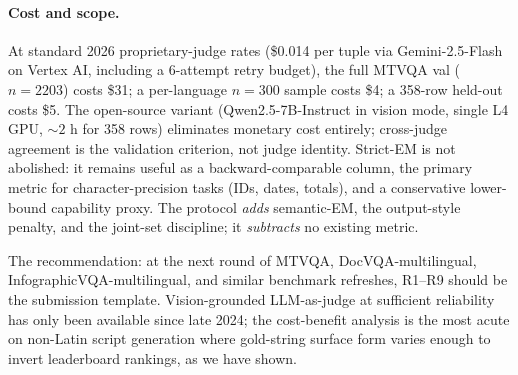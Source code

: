 \paragraph{Cost and scope.}
At standard 2026 proprietary-judge rates (\$0.014 per tuple via Gemini-2.5-Flash on Vertex AI, including a 6-attempt retry budget), the full MTVQA val ($n=2203$) costs \$31; a per-language $n=300$ sample costs \$4; a 358-row held-out costs \$5. The open-source variant (Qwen2.5-7B-Instruct in vision mode, single L4 GPU, $\sim 2$ h for 358 rows) eliminates monetary cost entirely; cross-judge agreement is the validation criterion, not judge identity. Strict-EM is not abolished: it remains useful as a backward-comparable column, the primary metric for character-precision tasks (IDs, dates, totals), and a conservative lower-bound capability proxy. The protocol \emph{adds} semantic-EM, the output-style penalty, and the joint-set discipline; it \emph{subtracts} no existing metric.

The recommendation: at the next round of MTVQA, DocVQA-multilingual, InfographicVQA-multilingual, and similar benchmark refreshes, R1--R9 should be the submission template. Vision-grounded LLM-as-judge at sufficient reliability has only been available since late 2024; the cost-benefit analysis is the most acute on non-Latin script generation where gold-string surface form varies enough to invert leaderboard rankings, as we have shown.
